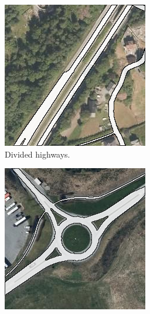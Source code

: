 \begin{figure}[h]
\begin{subfigure}{0.31\textwidth}
\includegraphics[width=\linewidth]{figs/datasets/nor_examples/1191_highway_vbase.png}
\caption{Divided highways.} \label{fig:norwegian_roads_highway_vbase}
\end{subfigure}
\hspace*{\fill} %
\begin{subfigure}{0.31\textwidth}
\includegraphics[width=\linewidth]{figs/datasets/nor_examples/1177_roundabout_vbase.png}

\end{subfigure}
\end{figure}
